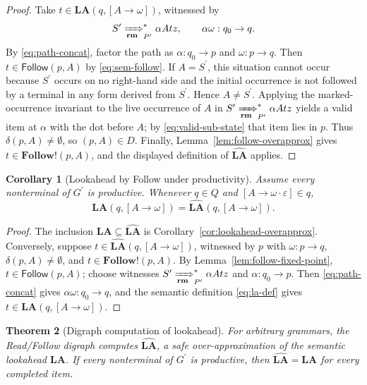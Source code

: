 \documentclass[11pt,a4paper]{article}
\theoremstyle{prettyplain}
\newtheorem{theorem}{Theorem}
\newtheorem{corollary}[theorem]{Corollary}
\theoremstyle{prettydef}
\newcommand{\eps}{\varepsilon}
\newcommand{\RMP}{\xRightarrow[\mathbf{rm}]{}_{P^\prime}}
\newcommand{\Path}[3]{#1:#2\to#3}
\newcommand{\Item}[2]{[#1\to #2]}
\newcommand{\Look}{\mathbf{LA}}
\newcommand{\Follow}{\mathbf{Follow}}
\begin{document}
\begin{proof}
Take \(t\in\Look(q,\Item{A}{\omega})\), witnessed by
\[
S^\prime\RMP^*\alpha A t z,
\qquad
\Path{\alpha\omega}{q_0}{q}.
\]
By \eqref{eq:path-concat}, factor the path as
\(\Path{\alpha}{q_0}{p}\) and \(\Path{\omega}{p}{q}\).  Then
\(t\in\mathsf{Follow}(p,A)\) by \eqref{eq:sem-follow}.  If \(A=S^\prime\), this
situation cannot occur because \(S^\prime\) occurs on no right-hand side and the
initial occurrence is not followed by a terminal in any form derived from
\(S^\prime\).  Hence \(A\ne S^\prime\).  Applying the marked-occurrence invariant
to the live occurrence of \(A\) in \(S^\prime\RMP^*\alpha A t z\) yields a valid
item at \(\alpha\) with the dot before \(A\); by \eqref{eq:valid-sub-state} that
item lies in \(p\).  Thus \(\delta(p,A)\ne\emptyset\), so \((p,A)\in D\).  Finally,
Lemma~\ref{lem:follow-overapprox} gives
\(t\in\Follow\mathbin{!}(p,A)\), and the displayed definition of
\(\widehat{\Look}\) applies.
\end{proof}

\begin{corollary}[Lookahead by Follow under productivity]\label{cor:lookahead-follow}
Assume every nonterminal of \(G^\prime\) is productive.  Whenever \(q\in Q\) and
\(\Item{A}{\omega\cdot\eps}\in q\),
\begin{equation}\label{eq:lookahead-exact}
\Look(q,\Item{A}{\omega})
=
\widehat{\Look}(q,\Item{A}{\omega}).
\end{equation}
\end{corollary}

\begin{proof}
The inclusion \(\Look\subseteq\widehat{\Look}\) is
Corollary~\ref{cor:lookahead-overapprox}.  Conversely, suppose
\(t\in\widehat{\Look}(q,\Item{A}{\omega})\), witnessed by \(p\) with
\(\Path{\omega}{p}{q}\), \(\delta(p,A)\ne\emptyset\), and
\(t\in\Follow\mathbin{!}(p,A)\).  By Lemma~\ref{lem:follow-fixed-point},
\(t\in\mathsf{Follow}(p,A)\); choose witnesses
\(S^\prime\RMP^*\alpha A t z\) and \(\Path{\alpha}{q_0}{p}\).  Then
\eqref{eq:path-concat} gives \(\Path{\alpha\omega}{q_0}{q}\), and the semantic
definition \eqref{eq:la-def} gives \(t\in\Look(q,\Item{A}{\omega})\).
\end{proof}

\begin{theorem}[Digraph computation of lookahead]\label{thm:read-follow}
For arbitrary grammars, the Read/Follow digraph computes
\(\widehat{\Look}\), a safe over-approximation of the semantic lookahead
\(\Look\).  If every nonterminal of \(G^\prime\) is productive, then
\(\widehat{\Look}=\Look\) for every completed item.
\end{theorem}
\end{document}
